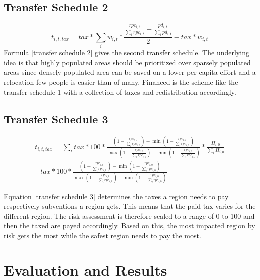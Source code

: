 \documentclass[10pt,a4paper]{article}
\begin{document}
\subsection{Transfer Schedule 2}

\begin{equation}
    t_{i,t,tax} = tax * \sum_i w_{i,t} * \frac{\frac{rpc_{i,t}}{\sum_i rpc_{i,t}} + \frac{pd_{i,t}}{\sum_i pd_{i,t}}}{2} - tax * w_{i,t}
    \label{transfer schedule 2}
\end{equation}
Formula \ref{transfer schedule 2} gives the second transfer schedule. The underlying idea is that highly populated areas should be prioritized over sparsely populated areas since densely populated area can be saved on a lower per capita effort and a relocation few people is easier than of many. Financed is the scheme like the transfer schedule 1 with a collection of taxes and redistribution accordingly. 

\subsection{Transfer Schedule 3}
\begin{multline}
    t_{i,t,tax} = \sum_{i}{tax * 100 * \frac{(1-\frac{rpc_{i,0}}{\sum_{i}rpc_{i,0}})-\min(1-\frac{rpc_{i,0}}{\sum_{i}rpc_{i,0}})}{\max(1-\frac{rpc_{i,0}}{\sum_{i}rpc_{i,0}})-\min(1-\frac{rpc_{i,0}}{\sum_{i}rpc_{i,0}})}}*\frac{H_{i,0}}{\sum_{i}H_{i,0}}\\-tax*100 * \frac{(1-\frac{rpc_{i,0}}{\sum_{i}rpc_{i,0}})-\min(1-\frac{rpc_{i,0}}{\sum_{i}rpc_{i,0}})}{\max(1-\frac{rpc_{i,0}}{\sum_{i}rpc_{i,0}})-\min(1-\frac{rpc_{i,0}}{\sum_{i}rpc_{i,0}})}
    \label{transfer schedule 3}
\end{multline}

Equation \ref{transfer schedule 3} determines the taxes a region needs to pay respectively subventions a region gets. This means that the paid tax varies for the different region. The risk assessment is therefore scaled to a range of 0 to 100 and then the taxed are payed accordingly. Based on this, the most impacted region by risk gets the most while the safest region needs to pay the most.
\newpage
\section{Evaluation and Results}
\end{document}
